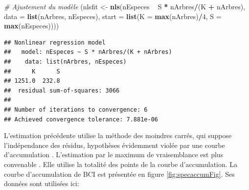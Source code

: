 \documentclass[
  11pt,
  french,
  a4paper,
  extrafontsizes,onecolumn,openright
  ]{memoir}
\newenvironment{Shaded}{\begin{snugshade}}{\end{snugshade}}
\newcommand{\CommentTok}[1]{\textcolor[rgb]{0.56,0.35,0.01}{\textit{#1}}}
\newcommand{\DataTypeTok}[1]{\textcolor[rgb]{0.13,0.29,0.53}{#1}}
\newcommand{\DecValTok}[1]{\textcolor[rgb]{0.00,0.00,0.81}{#1}}
\newcommand{\KeywordTok}[1]{\textcolor[rgb]{0.13,0.29,0.53}{\textbf{#1}}}
\newcommand{\NormalTok}[1]{#1}
\newcommand{\OperatorTok}[1]{\textcolor[rgb]{0.81,0.36,0.00}{\textbf{#1}}}
\newcommand{\StringTok}[1]{\textcolor[rgb]{0.31,0.60,0.02}{#1}}
\begin{document}
\scriptsize

\begin{Shaded}
\begin{Highlighting}[]
\CommentTok{# Ajustement du modèle}
\NormalTok{(nlsfit <-}\StringTok{ }\KeywordTok{nls}\NormalTok{(nEspeces }\OperatorTok{~}\StringTok{ }\NormalTok{S }\OperatorTok{*}\StringTok{ }\NormalTok{nArbres}\OperatorTok{/}\NormalTok{(K }\OperatorTok{+}\StringTok{ }\NormalTok{nArbres), }\DataTypeTok{data =} \KeywordTok{list}\NormalTok{(nArbres, }
\NormalTok{    nEspeces), }\DataTypeTok{start =} \KeywordTok{list}\NormalTok{(}\DataTypeTok{K =} \KeywordTok{max}\NormalTok{(nArbres)}\OperatorTok{/}\DecValTok{4}\NormalTok{, }\DataTypeTok{S =} \KeywordTok{max}\NormalTok{(nEspeces))))}
\end{Highlighting}
\end{Shaded}

\begin{verbatim}
## Nonlinear regression model
##   model: nEspeces ~ S * nArbres/(K + nArbres)
##    data: list(nArbres, nEspeces)
##      K      S 
## 1251.0  232.8 
##  residual sum-of-squares: 3066
## 
## Number of iterations to convergence: 6 
## Achieved convergence tolerance: 7.881e-06
\end{verbatim}

\normalsize

L'estimation précédente utilise la méthode des moindres carrés, qui suppose l'indépendance des résidus, hypothèses évidemment violée par une courbe d'accumulation \autocite{Colwell1994}.
L'estimation par le maximum de vraisemblance est plus convenable \autocite{Raaijmakers1987}.
Elle utilise la totalité des points de la courbe d'accumulation.
La courbe d'accumulation de BCI est présentée en figure \ref{fig:specaccumFig}.
Ses données sont utilisées ici:

\scriptsize
\end{document}
